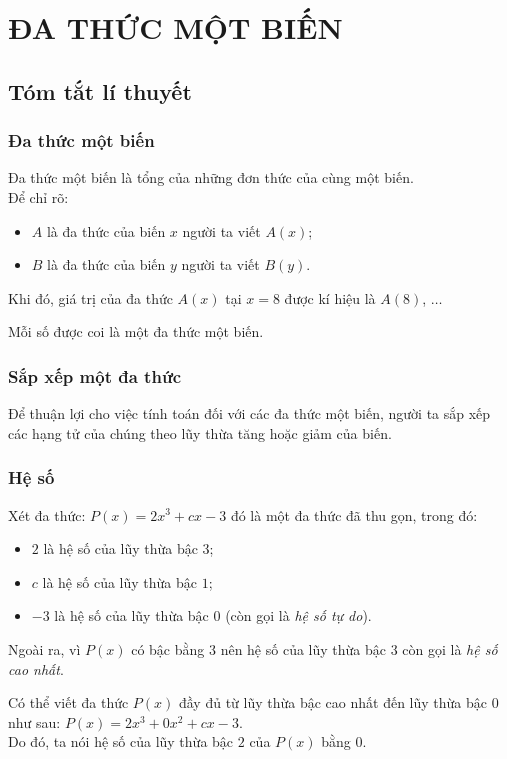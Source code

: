 \section{ĐA THỨC MỘT BIẾN}
\subsection{Tóm tắt lí thuyết}
\subsubsection{Đa thức một biến}
	Đa thức một biến là tổng của những đơn thức của cùng một biến.\\
	Để chỉ rõ:
	\begin{itemize}
		\item $A$ là đa thức của biến $x$ người ta viết $A(x)$;
		\item $B$ là đa thức của biến $y$ người ta viết $B(y)$.
	\end{itemize}
	Khi đó, giá trị của đa thức $A(x)$ tại $x = 8$ được kí hiệu là $A(8)$, $\ldots$
	\begin{note}
		Mỗi số được coi là một đa thức một biến.
	\end{note}
\subsubsection{Sắp xếp một đa thức}
	Để thuận lợi cho việc tính toán đối với các đa thức một biến, người ta sắp xếp các hạng tử của chúng theo lũy thừa tăng hoặc giảm của biến.
\subsubsection{Hệ số}
	Xét đa thức: $P(x) = 2x^3 + cx - 3$ đó là một đa thức đã thu gọn, trong đó:
	\begin{itemize}
		\item $2$ là hệ số của lũy thừa bậc $3$;
		\item $c$ là hệ số của lũy thừa bậc $1$;
		\item $-3$ là hệ số của lũy thừa bậc $0$ (còn gọi là \textit{hệ số tự do}).
	\end{itemize}
	Ngoài ra, vì $P(x)$ có bậc bằng $3$ nên hệ số của lũy thừa bậc $3$ còn gọi là \textit{hệ số cao nhất}.
	\begin{note}
		Có thể viết đa thức $P(x)$ đầy đủ từ lũy thừa bậc cao nhất đến lũy thừa bậc $0$ như sau: $P(x) = 2x^3 + 0x^2 + cx - 3$.\\
		Do đó, ta nói hệ số của lũy thừa bậc $2$ của $P(x)$ bằng $0$.
	\end{note}
